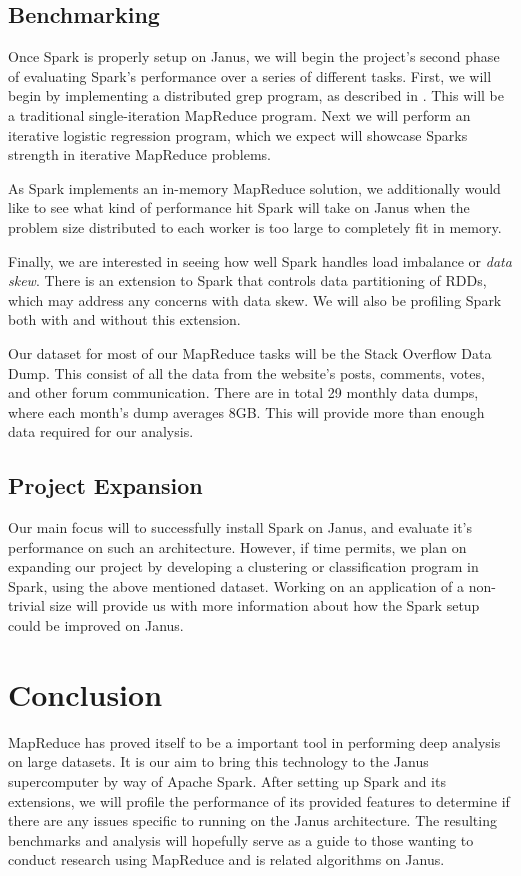 \documentclass{article}
\begin{document}
\subsection*{Benchmarking}
Once Spark is properly setup on Janus, we will begin the project's second phase
of evaluating Spark's performance over a series of different tasks. First, we
will begin by implementing a distributed grep program, as described in
\citep{dean-mapreduce}. This will be a traditional single-iteration MapReduce
program. Next we will perform an iterative logistic regression program, which
we expect will showcase Sparks strength in iterative MapReduce problems.

As Spark implements an in-memory MapReduce solution, we additionally would like
to see what kind of performance hit Spark will take on Janus when the problem
size distributed to each worker is too large to completely fit in memory.

Finally, we are interested in seeing how well Spark handles load imbalance or
\emph{data skew}. There is an extension to Spark that controls data
partitioning of RDDs, which may address any concerns with data skew. We will
also be profiling Spark both with and without this extension.

Our dataset for most of our MapReduce tasks will be the Stack Overflow Data
Dump. This consist of all the data from the website's posts, comments,
votes, and other forum communication. There are in total 29 monthly data dumps,
where each month's dump averages 8GB. This will provide more than enough data
required for our analysis.

\subsection*{Project Expansion}
Our main focus will to successfully install Spark on Janus, and evaluate it's
performance on such an architecture. However, if time permits, we plan on
expanding our project by developing a clustering or classification program in
Spark, using the above mentioned dataset. Working on an application of a
non-trivial size will provide us with more information about how the Spark
setup could be improved on Janus.

\section*{Conclusion}
MapReduce has proved itself to be a important tool in performing deep analysis
on large datasets. It is our aim to bring this technology to the Janus
supercomputer by way of Apache Spark. After setting up Spark and its
extensions, we will profile the performance of its provided features to
determine if there are any issues specific to running on the Janus
architecture. The resulting benchmarks and analysis will hopefully serve as a
guide to those wanting to conduct research using MapReduce and is related
algorithms on Janus.



\end{document}

